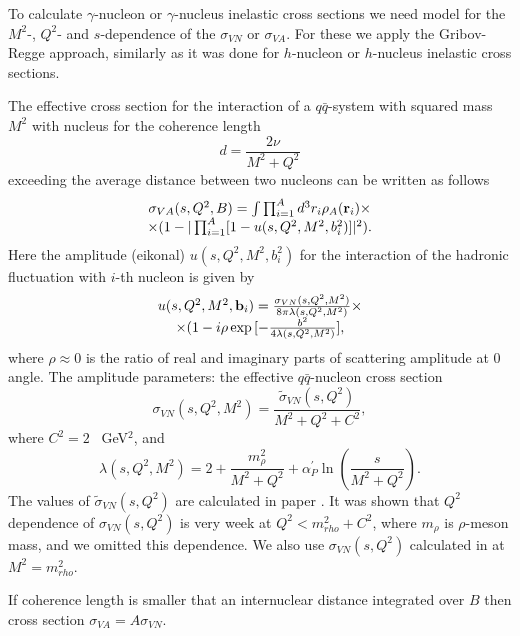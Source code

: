 To calculate $\gamma$-nucleon or $\gamma$-nucleus inelastic cross sections 
we need model for the $M^2$-, 
 $Q^2$- and $s$-dependence of the $\sigma_{VN}$ or $\sigma_{VA}$. For 
 these we  apply the 
Gribov-Regge approach, similarly as it was done for $h$-nucleon or $h$-nucleus 
inelastic cross sections.

The 
 effective cross section for the interaction of a $q\bar{q}$-system with
squared mass $M^2$ with nucleus for the coherence length
\begin{equation}
\label{HEGI5} d=\frac{2\nu}{M^2+Q^2}
\end{equation}
exceeding the average distance between two nucleons
can be written as follows
\begin{equation}
\begin{array}{c}
\label{HEGI6}\sigma_{V A}(s,Q^2,B)=\int \prod_{i=1}^{A} 
d^3 r_i\rho_A({\bf r}_i)
\times \\
\times (1 - |\prod_{i=1}^{A}[1-u(s,Q^2,M^2, b^2_i)]|^2).
\end{array}
\end{equation}
Here the amplitude (eikonal) 
$u(s,Q^2,M^2, b^2_i)$ for the interaction of 
the hadronic fluctuation with $i$-th nucleon 
is given by \cite{ERR97}
\begin{equation}
\begin{array}{c}
\label{HEGI7}u(s,Q^2,M^2,{\bf b}_i)=
\frac{\sigma_{VN}(s,Q^2,M^2)} {8 \pi \lambda(s,Q^2,M^2)} \times \\
\times (1-i \rho \exp{[-\frac{b^2}{4\lambda(s,Q^2,M^2)}]},
\end{array}
\end{equation}
where $\rho\approx 0$ is the ratio of real and imaginary parts of scattering 
amplitude at $0$ angle.
The amplitude parameters: the effective $q\bar{q}$-nucleon cross section  
\begin{equation}
\label{HEGI8} \sigma_{VN}(s,Q^2,M^2)=\frac{\tilde{\sigma}_{VN}(s,Q^2)}{M^2+Q^2+C^2},
\end{equation}
where $C^2=2$ \ GeV$^2$,
and
\begin{equation}
\label{HEGI9}\lambda(s,Q^2,M^2)=2+\frac{m^2_{\rho}}{M^2+Q^2} + 
\alpha_{P}^{\prime}
\ln{(\frac{s}{M^2+Q^2})}. 
\end{equation}
The values of $\tilde{\sigma}_{VN}(s,Q^2)$ are calculated in paper
\cite{ERR97}.
It was shown \cite{ERR97} that $Q^2$ dependence of $\sigma_{VN}(s,Q^2)$ 
is very week at $Q^2 < m^2_{rho} + C^2$, where $m_{\rho}$ is 
$\rho$-meson mass, and we omitted this dependence. We also use 
$\sigma_{VN}(s,Q^2)$ calculated  in \cite{ERR97} at $M^2=m^2_{rho}$.

 If coherence length is smaller that an internuclear distance integrated 
over $B$ then cross section 
$\sigma_{VA}=A\sigma_{VN}$.

